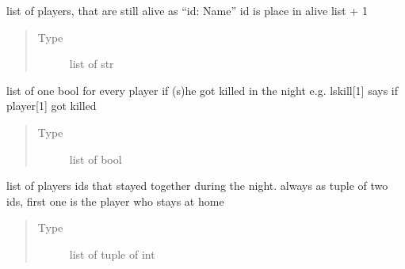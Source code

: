 \documentclass[letterpaper,10pt,english]{sphinxmanual}
\begin{document}
\begin{fulllineitems}
\begin{fulllineitems}
\begin{quote}
\begin{description}
\end{description}\end{quote}

\end{fulllineitems}


\begin{fulllineitems}
\label{\detokenize{chatwolf:chatwolf.nightactions.Nightactions.alive_string}}
list of players, that are still alive as “id: Name”
id is place in alive list + 1
\begin{quote}\begin{description}
\item[{Type}] \leavevmode
list of str

\end{description}\end{quote}

\end{fulllineitems}


\begin{fulllineitems}
\label{\detokenize{chatwolf:chatwolf.nightactions.Nightactions.lskill}}
list of one bool for every player if (s)he got killed in the night
e.g. lskill{[}1{]} says if player{[}1{]} got killed
\begin{quote}\begin{description}
\item[{Type}] \leavevmode
list of bool

\end{description}\end{quote}

\end{fulllineitems}


\begin{fulllineitems}
\label{\detokenize{chatwolf:chatwolf.nightactions.Nightactions.lstogether}}
list of players ids that stayed together during the night.
always as tuple of two ids, first one is the player who stays at home
\begin{quote}\begin{description}
\item[{Type}] \leavevmode
list of tuple of int


\end{description}
\end{quote}
\end{fulllineitems}
\end{fulllineitems}
\end{document}
